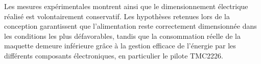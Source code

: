 Les mesures expérimentales montrent ainsi que le dimensionnement électrique réalisé est volontairement conservatif. Les hypothèses retenues lors de la conception garantissent que l'alimentation reste correctement dimensionnée dans les conditions les plus défavorables, tandis que la consommation réelle de la maquette demeure inférieure grâce à la gestion efficace de l'énergie par les différents composants électroniques, en particulier le pilote TMC2226.
